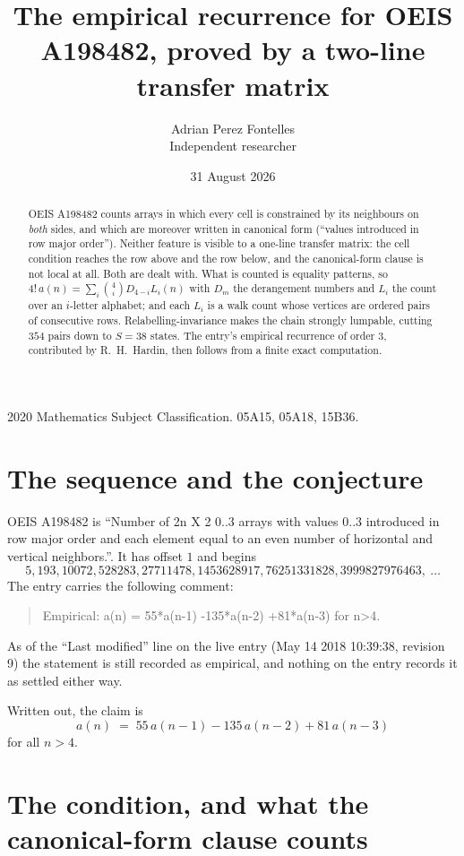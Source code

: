 \documentclass[11pt,a4paper]{article}
\title{The empirical recurrence for OEIS A198482, proved by a two-line transfer matrix}
\author{Adrian Perez Fontelles\\ \small Independent researcher}
\date{31 August 2026}
\theoremstyle{plain}
\theoremstyle{definition}
\begin{document}
\maketitle

\begin{abstract}
OEIS A198482 counts arrays in which every cell is constrained by its neighbours on \emph{both}
sides, and which are moreover written in canonical form (``values introduced in row major
order''). Neither feature is visible to a one-line transfer matrix: the cell condition
reaches the row above and the row below, and the canonical-form clause is not local at
all. Both are dealt with. What is counted is equality patterns, so
$4!\,a(n)=\sum_i\binom{4}{i}D_{4-i}L_i(n)$ with $D_m$ the derangement numbers and
$L_i$ the count over an $i$-letter alphabet; and each $L_i$ is a walk count whose vertices
are ordered pairs of consecutive rows. Relabelling-invariance makes the chain strongly
lumpable, cutting $354$ pairs down to $S=38$ states. The entry's empirical recurrence of
order $3$, contributed by R.~H.~Hardin, then follows from a finite exact computation.
\end{abstract}

\noindent\small 2020 Mathematics Subject Classification. 05A15, 05A18, 15B36.\normalsize

\section{The sequence and the conjecture}

OEIS A198482 is ``Number of 2n X 2 0..3 arrays with values 0..3 introduced in row major order and each element equal to an even number of horizontal and vertical neighbors.''. It has offset $1$ and begins
\[
5, 193, 10072, 528283, 27711478, 1453628917, 76251331828, 3999827976463,\ \dots
\]
The entry carries the following comment:
\begin{quote}\small
Empirical: a(n) = 55*a(n-1) -135*a(n-2) +81*a(n-3) for n>4.
\end{quote}
As of the ``Last modified'' line on the live entry (May 14 2018 10:39:38, revision 9) the statement is
still recorded as empirical, and nothing on the entry records it as settled either way.

Written out, the claim is
\begin{equation}\label{eq:conj}
a(n)\;=\;55\,a(n-1) - 135\,a(n-2) + 81\,a(n-3)
\end{equation}
for all $n>4$.

\section{The condition, and what the canonical-form clause counts}
\end{document}
